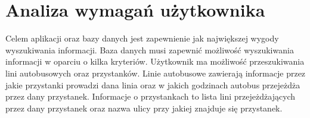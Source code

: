 \section{Analiza wymagań użytkownika}


Celem aplikacji oraz bazy danych jest zapewnienie jak największej wygody wyszukiwania informacji. Baza danych musi zapewnić możliwość wyszukiwania informacji w oparciu o kilka kryteriów. Użytkownik ma możliwość przeszukiwania lini autobusowych oraz przystanków. Linie autobusowe zawierają informacje przez jakie przystanki prowadzi dana linia oraz w jakich godzinach autobus przejeżdża przez dany przystanek. Informacje o przystankach to lista lini przejeżdżających przez dany przystanek oraz nazwa ulicy przy jakiej znajduje się przystanek.